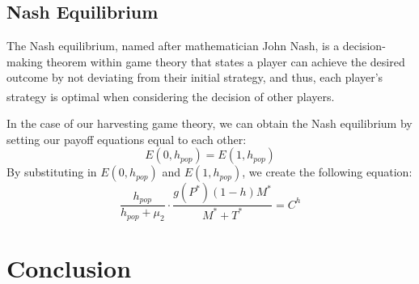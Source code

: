 \documentclass[12pt]{article}
\begin{document}
\subsection{Nash Equilibrium}
The Nash equilibrium, named after mathematician John Nash, is a decision-making theorem within game theory that states a player can achieve the desired outcome by not deviating from their initial strategy, and thus, each player's strategy is optimal when considering the decision of other players\textsuperscript{\cite{nash_definition}}. \par
In the case of our harvesting game theory, we can obtain the Nash equilibrium by setting our payoff equations equal to each other:
\begin{equation*}
    E(0, h_{pop}) = E(1, h_{pop})
\end{equation*}
By substituting in $E(0, h_{pop})$ and $E(1, h_{pop})$, we create the following equation:
\begin{equation*}\label{eq:unsimplified_nash}
    \frac{h_{pop}}{h_{pop} + \mu_{2}} \cdot \frac{g(P^{*})(1-h)M^{*}}{M^{*} + T^{*}} = C^{h}
\end{equation*}

\section{Conclusion}
\end{document}
